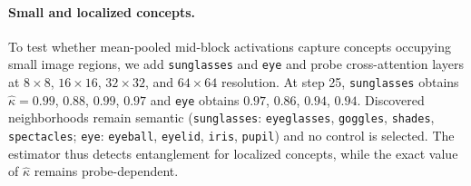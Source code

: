 \paragraph{Small and localized concepts.} To test whether mean-pooled
mid-block activations capture concepts occupying small image regions, we add
\texttt{sunglasses} and \texttt{eye} and probe cross-attention layers at
$8\times8$, $16\times16$, $32\times32$, and $64\times64$ resolution. At step 25,
\texttt{sunglasses} obtains $\hat\kappa=0.99$, $0.88$, $0.99$, $0.97$ and
\texttt{eye} obtains $0.97$, $0.86$, $0.94$, $0.94$. Discovered neighborhoods
remain semantic (\texttt{sunglasses}: \texttt{eyeglasses}, \texttt{goggles},
\texttt{shades}, \texttt{spectacles}; \texttt{eye}: \texttt{eyeball},
\texttt{eyelid}, \texttt{iris}, \texttt{pupil}) and no control is selected. The
estimator thus detects entanglement for localized concepts, while the exact
value of $\hat\kappa$ remains probe-dependent.
